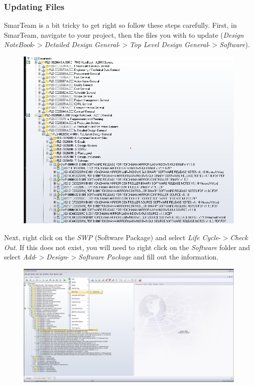 \documentclass[10pt]{article}
\begin{document}
            \subsubsection{Updating Files}
                SmarTeam is a bit tricky to get right so follow these steps carefully. First, in SmarTeam, navigate to your project, then the files you with to update (\emph{Design NoteBook}-$>$\emph{Detailed Design General}-$>$\emph{Top Level Design General}-$>$\emph{Software}).
                \begin{figure}[H]
                    \centerline{\includegraphics[width=\textwidth]{References/ST Software Folder.png}}
                \end{figure}
                Next, right click on the \emph{SWP} (Software Package) and select \emph{Life Cycle}-$>$\emph{Check Out}. If this does not exist, you will need to right click on the \emph{Software} folder and select \emph{Add}-$>$\emph{Design}-$>$\emph{Software Package} and fill out the information.
                \begin{figure}[H]
                    \centerline{\includegraphics[width=\textwidth]{References/ST Check Out.png}}
                \end{figure}
\end{document}
